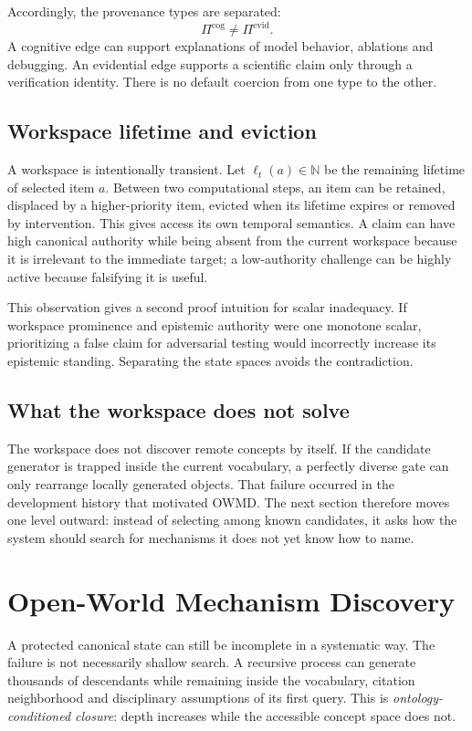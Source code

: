 \documentclass[11pt]{article}
\begin{document}
Accordingly, the provenance types are separated:
\[
\Pi^{\mathrm{cog}}\neq\Pi^{\mathrm{evid}}.
\]
A cognitive edge can support explanations of model behavior, ablations and debugging. An evidential edge supports a scientific claim only through a verification identity. There is no default coercion from one type to the other.

\subsection{Workspace lifetime and eviction}

A workspace is intentionally transient. Let \(\ell_t(a)\in\mathbb N\) be the remaining lifetime of selected item \(a\). Between two computational steps, an item can be retained, displaced by a higher-priority item, evicted when its lifetime expires or removed by intervention. This gives access its own temporal semantics. A claim can have high canonical authority while being absent from the current workspace because it is irrelevant to the immediate target; a low-authority challenge can be highly active because falsifying it is useful.

This observation gives a second proof intuition for scalar inadequacy. If workspace prominence and epistemic authority were one monotone scalar, prioritizing a false claim for adversarial testing would incorrectly increase its epistemic standing. Separating the state spaces avoids the contradiction.

\subsection{What the workspace does not solve}

The workspace does not discover remote concepts by itself. If the candidate generator is trapped inside the current vocabulary, a perfectly diverse gate can only rearrange locally generated objects. That failure occurred in the development history that motivated OWMD. The next section therefore moves one level outward: instead of selecting among known candidates, it asks how the system should search for mechanisms it does not yet know how to name.

\section{Open-World Mechanism Discovery}

A protected canonical state can still be incomplete in a systematic way. The failure is not necessarily shallow search. A recursive process can generate thousands of descendants while remaining inside the vocabulary, citation neighborhood and disciplinary assumptions of its first query. This is \emph{ontology-conditioned closure}: depth increases while the accessible concept space does not.
\end{document}
